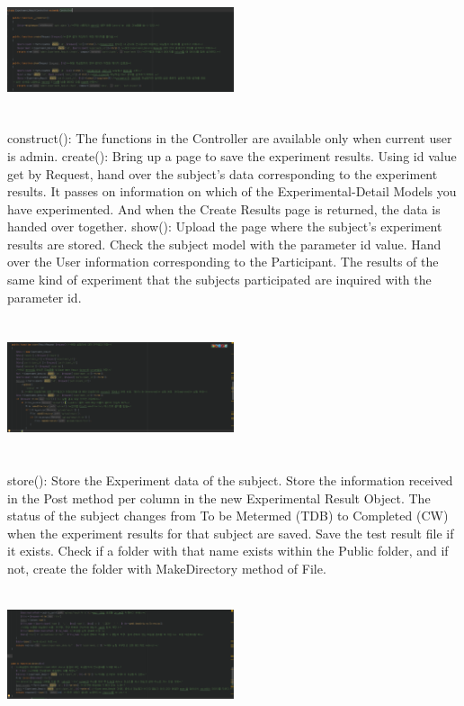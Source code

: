 \documentclass[letterpaper, 10 pt, conference]{ieeeconf}  %
\begin{document}
\begin{center}
\includegraphics[width=0.5\textwidth,height = 3.75cm]{class/f1.png}
\end{center}
construct(): The functions in the Controller are available only when current user is admin.
create(): Bring up a page to save the experiment results. Using id value get by Request, hand over the subject's data corresponding to the experiment results. It passes on information on which of the Experimental-Detail Models you have experimented. And when the Create Results page is returned, the data is handed over together.
show(): Upload the page where the subject's experiment results are stored. Check the subject model with the parameter id value. Hand over the User information corresponding to the Participant. The results of the same kind of experiment that the subjects participated are inquired with the parameter id.
\begin{center}
\includegraphics[width=0.5\textwidth,height = 4cm]{class/f2.png}
\end{center}
store(): Store the Experiment data of the subject. Store the information received in the Post method per column in the new Experimental Result Object. The status of the subject changes from To be Metermed (TDB) to Completed (CW) when the experiment results for that subject are saved. Save the test result file if it exists. Check if a folder with that name exists within the Public folder, and if not, create the folder with MakeDirectory method of File.
\begin{center}
\includegraphics[width=0.5\textwidth,height = 3.75cm]{class/f3.png}
\end{center}
\end{document}
